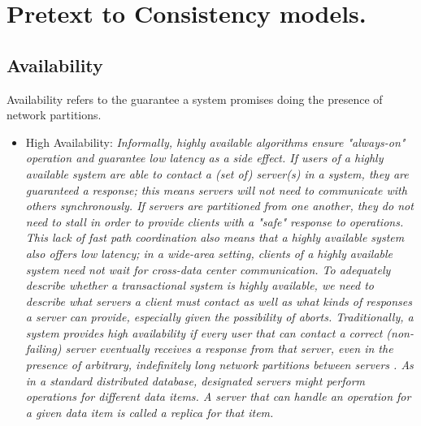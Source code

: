 \documentclass[a4paper,10pt,titlepage]{report}
\begin{document}
    \newpage


    \section{Pretext to Consistency models.}

    \subsection{Availability}

    Availability refers to the guarantee a system promises doing the presence of network partitions.\cite{HighlyAvailableTransactionsVirtuesandLimitations}

    \begin{itemize}
        \item High Availability:
        \textit{
            Informally, highly available algorithms ensure "always-on" operation and guarantee low latency as a side effect. If users of a highly available system are able to contact a (set of) server(s) in a system, they are guaranteed a response; this means servers will not need to communicate with others synchronously. If servers are partitioned from one another, they do not need to stall in order to provide clients with a "safe" response to operations. This lack of fast path coordination also means that a highly available system also offers low latency; in a wide-area setting, clients of a highly available system need not wait for cross-data center communication. To adequately describe whether a transactional system is highly available, we need to describe what servers a client must contact as well as what kinds of responses a server can provide, especially given the possibility of aborts. Traditionally, a system provides high availability if every user that can contact a correct (non-failing) server eventually receives a response from that server, even in the presence of arbitrary, indefinitely long network partitions between servers \cite{CAP}. As in a standard distributed database, designated servers might perform operations for different data items. A server that can handle an operation for a given data item is called a replica for that item.}\cite{HighlyAvailableTransactionsVirtuesandLimitations}

\end{itemize}
\end{document}
